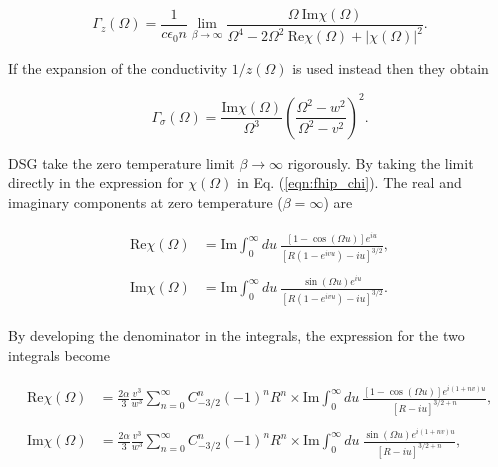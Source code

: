 \begin{equation}
    \Gamma_z(\Omega) = \frac{1}{c \epsilon_0 n} \lim_{\beta \to \infty} \frac{\Omega\ \textrm{Im}\chi(\Omega)}{\Omega^4 - 2 \Omega^2\ \textrm{Re} \chi(\Omega) + |\chi(\Omega)|^2}.
\end{equation}

If the expansion of the conductivity $1/z(\Omega)$ is used instead then they obtain

\begin{equation}
    \Gamma_\sigma(\Omega) = \frac{\text{Im}\chi(\Omega)}{\Omega^3} \left( \frac{\Omega^2 - w^2}{\Omega^2 -v^2} \right)^2.
\end{equation}

DSG take the zero temperature limit $\beta \to \infty$ rigorously. By taking the limit directly in the expression for $\chi(\Omega)$ in Eq. (\ref{eqn:fhip_chi}). The real and imaginary components at zero temperature ($\beta = \infty$) are

\begin{subequations}
    \begin{align}
    \begin{split}
        \text{Re} \chi(\Omega) &= \text{Im} \int^{\infty}_0 du\ \frac{\left[1 - \cos(\Omega u)\right] e^{iu}}{\left[R(1-e^{ivu}) - iu\right]^{3/2}},
    \end{split}\\
    \begin{split}
        \text{Im} \chi(\Omega) &= \text{Im} \int^{\infty}_0 du\ \frac{\sin(\Omega u) e^{iu}}{\left[R(1-e^{ivu}) - iu\right]^{3/2}}.
    \end{split}
    \end{align}
\end{subequations}

By developing the denominator in the integrals, the expression for the two integrals become

\begin{subequations}
    \begin{align}
    \begin{split}
        \text{Re} \chi(\Omega) &= \frac{2\alpha}{3} \frac{v^3}{w^3} \sum_{n = 0}^\infty C^n_{-3/2} (-1)^n R^n \times \text{Im} \int^{\infty}_0 du\ \frac{\left[1 - \cos(\Omega u)\right] e^{i(1+nv)u}}{\left[R - iu\right]^{3/2 + n}},
    \end{split}\\
    \begin{split}\label{eqn:reX_exp}
        \text{Im} \chi(\Omega) &= \frac{2\alpha}{3} \frac{v^3}{w^3} \sum_{n = 0}^\infty C^n_{-3/2} (-1)^n R^n \times \text{Im} \int^{\infty}_0 du\ \frac{\sin(\Omega u) e^{i(1+nv)u}}{\left[R - iu\right]^{3/2 + n}},
    \end{split}
    \end{align}
\end{subequations}

